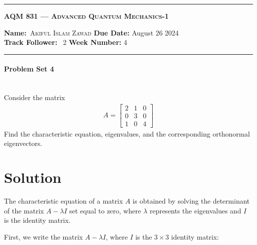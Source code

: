 \begin{center}
	\hrule
	\vspace{.4cm}
	\Large\scshape\textbf{AQM 831 --- Advanced Quantum Mechanics-1}
\end{center}
{\textbf{Name:}\ \textsc{Akiful Islam Zawad} \hspace{\hfill} \textbf{Due Date:} August 26 2024\\[5pt]
{ \textbf{Track Follower:}} \ 2 \hspace{\hfill} \textbf{Week Number:} 4 \\
	\hrule}
\paragraph*{Problem Set 4} %
\\
Consider the matrix
\begin{align*}
    A = \begin{bmatrix}
    2 & 1 & 0 \\
    0 & 3 & 0 \\
    1 & 0 & 4
    \end{bmatrix}
\end{align*}
Find the characteristic equation, eigenvalues, and the corresponding orthonormal eigenvectors.
\bigskip\bigskip\hline\hline\bigskip
\section*{Solution}
The characteristic equation of a matrix $A$ is obtained by solving the determinant of the matrix $A - \lambda I$ set equal to zero, where $\lambda$ represents the eigenvalues and $I$ is the identity matrix.

First, we write the matrix $A - \lambda I$, where $I$ is the $3 \times 3$ identity matrix:

